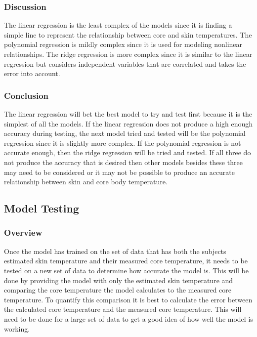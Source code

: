 		\subsubsection*{Discussion}
		
		The linear regression is the least complex of the models since it is finding a simple line to represent the relationship between core and skin temperatures. The polynomial regression is mildly complex since it is used for modeling nonlinear relationships. The ridge regression is more complex since it is similar to the linear regression but considers independent variables that are correlated and takes the error into account.

		\subsubsection*{Conclusion}	

        The linear regression will bet the best model to try and test first because it is the simplest of all the models. If the linear regression does not produce a high enough accuracy during testing, the next model tried and tested will be the polynomial regression since it is slightly more complex. If the polynomial regression is not accurate enough, then the ridge regression will be tried and tested. If all three do not produce the accuracy that is desired then other models besides these three may need to be considered or it may not be possible to produce an accurate relationship between skin and core body temperature. 

	\subsection*{Model Testing}
		\subsubsection*{Overview}
        
        Once the model has trained on the set of data that has both the subjects estimated skin temperature and their measured core temperature, it needs to be tested on a new set of data to determine how accurate the model is. This will be done by providing the model with only the estimated skin temperature and comparing the core temperature the model calculates to the measured core temperature. To quantify this comparison it is best to calculate the error between the calculated core temperature and the measured core temperature. This will need to be done for a large set of data to get a good idea of how well the model is working.
        
